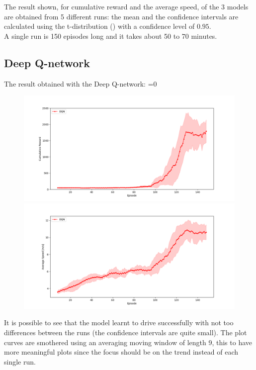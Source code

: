 \documentclass[14pt]{extarticle}
\def\sp{\vspace{5pt}}
\def\pp{\vspace{10pt}\newline}
\newcounter{debug}
\begin{document}
\begin{flushleft}
The result shown, for cumulative reward and the average speed, of the 3 models are obtained from 5 different runs: the mean and the confidence intervals are calculated  using the t-distribution (\cite{Tdistri}) with a confidence level of $0.95$. \\
A single run is 150 episodes long and it takes about 50 to 70 minutes.

\subsection{Deep Q-network}
\sp
The result obtained with the Deep Q-network:
\ifnum\value{debug}=0 {
\vspace{-5mm}
	\begin{figure}[H]
    		\centering\includegraphics[width=1\textwidth]{./Image/Results/D/plot0_reward.png}
    		\vspace{-5mm}
    		\centering\includegraphics[width=1\textwidth]{./Image/Results/D/plot0_speed.png}
	\end{figure}
	}\fi
It is possible to see that the model learnt to drive successfully with not too differences between the runs (the confidence intervals are quite small).
\pp
The plot curves are smothered using an averaging moving window of length 9, this to have more meaningful plots since the focus should be on the trend instead of each single run.


\end{flushleft}
\end{document}
